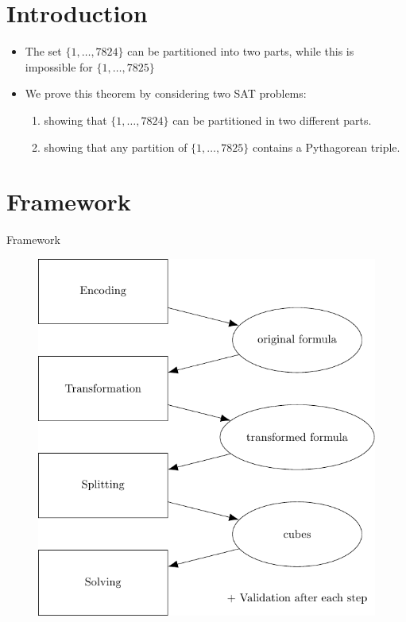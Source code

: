 \documentclass[c,8pt,xcolor...,x11names,usenames,dvipsnames]{beamer}
\begin{document}
\section{Introduction}

\begin{frame}{}
	\begin{itemize}
		\item The set  $ \{1, \ldots, 7824\}  $ can be partitioned into two parts, while this is impossible for $ \{1, \ldots, 7825\}  $
		\pause
		\item We prove this  theorem by considering two SAT problems: \pause
		\begin{enumerate}
			\item showing that $ \{1, \ldots, 7824\}  $  can be partitioned in two different parts. \pause
			\item showing  that any partition of $ \{1, \ldots, 7825\}  $ contains a  Pythagorean triple.
		\end{enumerate}

	\end{itemize}
\end{frame}




\section{Framework}

\begin{frame}{Framework}
	\begin{figure}
		\includegraphics[scale=0.65]{images/framework}
	\end{figure}
\end{frame}
\end{document}
